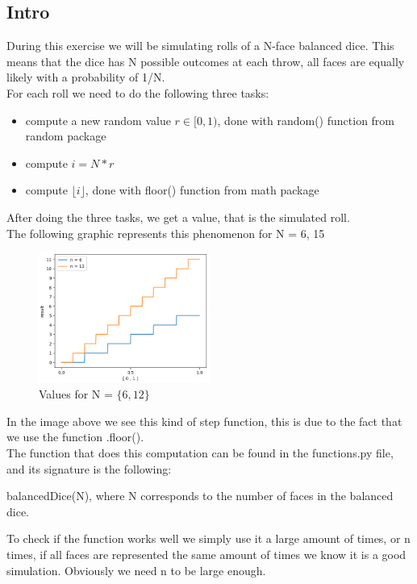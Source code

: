 \documentclass[a4paper]{article}
\begin{document}
\subsection*{Intro}
During this exercise we will be simulating rolls of a N-face balanced dice. This means that the dice has N possible outcomes at each throw, all faces are equally likely with a probability of 1/N.\\
For each roll we need to do the following three tasks:
\begin{itemize}
\item [(1)] compute a new random value $r \in [0,1)$, done with random() function from random package
\item [(2)] compute $i = N * r$
\item [(3)] compute $\lfloor i \rfloor$, done with floor() function from math package
\end{itemize}
After doing the three tasks, we get a value, that is the simulated roll.\\
The following graphic represents this phenomenon for N = {6, 15}\\
\begin{figure}[H]
\center
\includegraphics[width=0.5\textwidth]{images/balanced_dice.PNG}
\caption{Values for N = $\{6, 12\}$}
\end{figure}
In the image above we see this kind of step function, this is due to the fact that we use the function .floor().\\
The function that does this computation can be found in the functions.py file, and its signature is the following:
\begin{center}
balancedDice(N), where N corresponds to the number of faces in the balanced dice.
\end{center}
To check if the function works well we simply use it a large amount of times, or n times, if all faces are represented the same amount of times we know it is a good simulation. Obviously we need n to be large enough.
\end{document}
